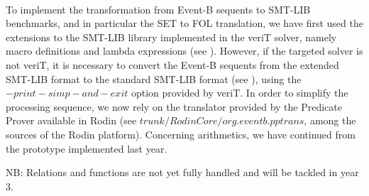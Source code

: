 \paragraph{}
To implement the transformation from Event-B sequents to SMT-LIB benchmarks, and in particular the SET to FOL translation, we have first used the extensions to the SMT-LIB library implemented in the veriT solver, namely macro definitions and lambda expressions (see \cite{BSMT10}). However, if the targeted solver is not veriT, it is necessary to convert the Event-B sequents from the extended SMT-LIB format to the standard SMT-LIB format (see \cite{RODINSMT10}), using the $-print-simp-and-exit$ option provided by veriT.
In order to simplify the processing sequence, we now rely on the translator provided by the Predicate Prover available in Rodin (see $trunk/RodinCore/org.eventb.pptrans$, among the sources\cite{SOURCES} of the Rodin platform). 
Concerning arithmetics, we have continued from the prototype\cite{B2SMT09} implemented last year.

NB: Relations and functions are not yet fully handled and will be tackled in year 3.
